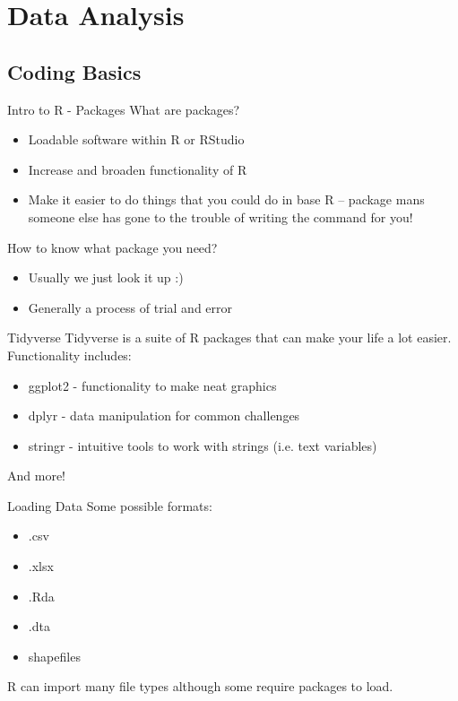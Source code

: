 \documentclass{beamer}
\begin{document}
\section{Data Analysis} 
\subsection{Coding Basics} 
\begin{frame}{Intro to R - Packages}
What are packages?
\begin{itemize}
    \item Loadable software within R or RStudio 
    \item Increase and broaden functionality of R
    \item Make it easier to do things that you could do in base R -- package mans someone else has gone to the trouble of writing the command for you!
\end{itemize}
How to know what package you need?
\begin{itemize}
    \item Usually we just look it up :) 
    \item Generally a process of trial and error 
\end{itemize}
\end{frame} 
\begin{frame}{Tidyverse}
Tidyverse is a suite of R packages that can make your life a lot easier. Functionality includes:
\begin{itemize}
    \item ggplot2 - functionality to make neat graphics 
    \item dplyr - data manipulation for common challenges 
    \item stringr - intuitive tools to work with strings (i.e. text variables) 
\end{itemize}
And more!
\end{frame} 
\begin{frame}{Loading Data}
Some possible formats:
\begin{itemize}
    \item .csv 
    \item .xlsx
    \item .Rda 
    \item .dta 
    \item shapefiles 
\end{itemize}
R can import many file types although some require packages to load. 
\end{frame}  
\end{document}
